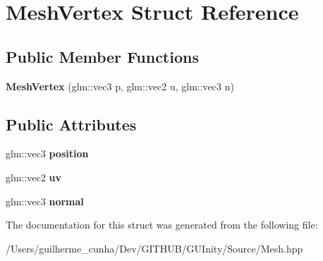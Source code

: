 \hypertarget{struct_mesh_vertex}{}\section{Mesh\+Vertex Struct Reference}
\label{struct_mesh_vertex}
\subsection*{Public Member Functions}
\begin{DoxyCompactItemize}
\item 
\hypertarget{struct_mesh_vertex_a15d2eb5d5fb10a50f590c66c5ae218fd}{}{\bfseries Mesh\+Vertex} (glm\+::vec3 p, glm\+::vec2 u, glm\+::vec3 n)\label{struct_mesh_vertex_a15d2eb5d5fb10a50f590c66c5ae218fd}

\end{DoxyCompactItemize}
\subsection*{Public Attributes}
\begin{DoxyCompactItemize}
\item 
\hypertarget{struct_mesh_vertex_af424f4ac16e7aa6359862ee38fbaf309}{}glm\+::vec3 {\bfseries position}\label{struct_mesh_vertex_af424f4ac16e7aa6359862ee38fbaf309}

\item 
\hypertarget{struct_mesh_vertex_a33831d8380f887676941c4fa8d11f756}{}glm\+::vec2 {\bfseries uv}\label{struct_mesh_vertex_a33831d8380f887676941c4fa8d11f756}

\item 
\hypertarget{struct_mesh_vertex_a9bd172f6367dd18d5a3537a0c1d4c72a}{}glm\+::vec3 {\bfseries normal}\label{struct_mesh_vertex_a9bd172f6367dd18d5a3537a0c1d4c72a}

\end{DoxyCompactItemize}


The documentation for this struct was generated from the following file\+:\begin{DoxyCompactItemize}
\item 
/\+Users/guilherme\+\_\+cunha/\+Dev/\+G\+I\+T\+H\+U\+B/\+G\+U\+Inity/\+Source/Mesh.\+hpp\end{DoxyCompactItemize}
